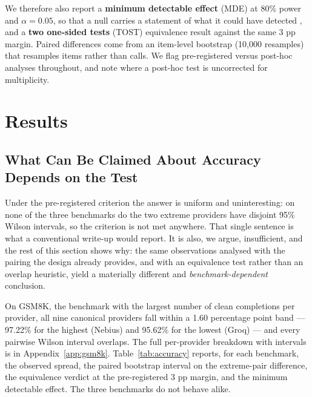 \documentclass[11pt]{article}
\begin{document}
We therefore also report a \textbf{minimum detectable effect} (MDE) at
80\% power and $\alpha = 0.05$, so that a null carries a statement of
what it could have detected \citep{card2020power}, and a \textbf{two
one-sided tests} (TOST) equivalence result \citep{lakens2017tost}
against the same 3 pp margin. Paired differences come from an
item-level bootstrap (10,000 resamples) that resamples items rather
than calls. We flag pre-registered versus post-hoc analyses
throughout, and note where a post-hoc test is uncorrected for
multiplicity.

\section{Results}

\subsection{What Can Be Claimed About Accuracy Depends on the Test}
\label{sec:accuracy}

Under the pre-registered criterion the answer is uniform and
uninteresting: on none of the three benchmarks do the two extreme
providers have disjoint 95\% Wilson intervals, so the criterion is not
met anywhere. That single sentence is what a conventional write-up
would report. It is also, we argue, insufficient, and the rest of this
section shows why: the same observations analysed with the pairing the
design already provides, and with an equivalence test rather than an
overlap heuristic, yield a materially different and \emph{benchmark-dependent}
conclusion.

On GSM8K, the benchmark with the largest number of clean completions
per provider, all nine canonical providers fall within a 1.60
percentage point band --- 97.22\% for the highest (Nebius) and 95.62\%
for the lowest (Groq) --- and every pairwise Wilson interval overlaps.
The full per-provider breakdown with intervals is in
Appendix~\ref{app:gsm8k}.
Table~\ref{tab:accuracy} reports, for each benchmark, the observed
spread, the paired bootstrap interval on the extreme-pair difference,
the equivalence verdict at the pre-registered 3 pp margin, and the
minimum detectable effect. The three benchmarks do not behave alike.
\end{document}
